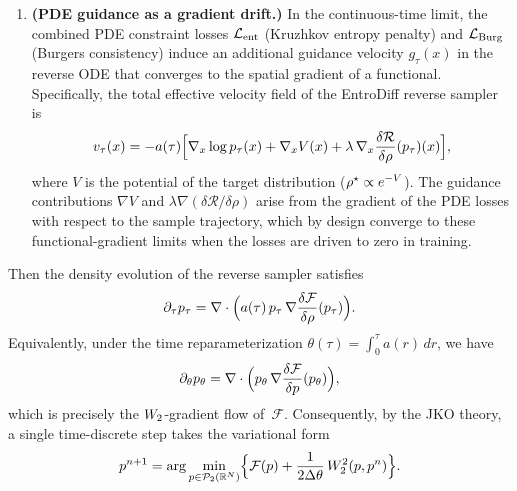 \begin{theorem}
\begin{enumerate}
\item \textbf{(PDE guidance as a gradient drift.)}
  In the continuous-time limit, the combined PDE constraint losses $\mathcal{L}_{\mathrm{ent}}$
  (Kruzhkov entropy penalty) and $\mathcal{L}_{\mathrm{Burg}}$ (Burgers consistency) induce an additional
  guidance velocity $g_{\tau}(x)$ in the reverse ODE that converges to the spatial
  gradient of a functional.
  Specifically, the total effective velocity field of the EntroDiff reverse sampler is
  \begin{equation}
  \label{eq:total-vel-stmt}
  v_{\tau}(x)
    = -a(\tau)\Bigl[
        \nabla_x\log p_{\tau}(x)
        + \nabla_x V(x)
        + \lambda\,\nabla_x\frac{\delta\mathcal{R}}{\delta\rho}(p_{\tau})(x)
      \Bigr],
  \end{equation}
  where $V$ is the potential of the target distribution ($\rho^{\star} \propto e^{-V}$).
  The guidance contributions $\nabla V$ and $\lambda\nabla(\delta\mathcal{R}/\delta\rho)$
  arise from the gradient of the PDE losses with respect to the sample trajectory,
  which by design converge to these functional-gradient limits when the losses are driven
  to zero in training.
\end{enumerate}

Then the density evolution of the reverse sampler satisfies
\begin{equation}
\label{eq:density-flow}
\partial_{\tau} p_{\tau} = \nabla \cdot \Bigl( a(\tau)\, p_{\tau}\, \nabla\frac{\delta\mathcal{F}}{\delta\rho}(p_{\tau}) \Bigr).
\end{equation}
Equivalently, under the time reparameterization
$\theta(\tau) = \int_{0}^{\tau} a(r)\,dr$, we have
\begin{equation}
\label{eq:W2-flow}
\partial_{\theta} p_{\theta}
  = \nabla \cdot \Bigl( p_{\theta}\, \nabla\frac{\delta\mathcal{F}}{\delta p}(p_{\theta}) \Bigr),
\end{equation}
which is precisely the $W_{2}$-gradient flow of~$\mathcal{F}$.
Consequently, by the JKO theory, a single time-discrete step takes the variational form
\begin{equation}
\label{eq:jko-step}
p^{n+1}
  = \arg\min_{p \in \mathcal{P}_{2}(\mathbb{R}^{N})}
    \Bigl\{ \mathcal{F}(p) + \frac{1}{2\Delta\theta}\,W_{2}^{2}(p, p^{n}) \Bigr\}.
\end{equation}
\end{theorem}

